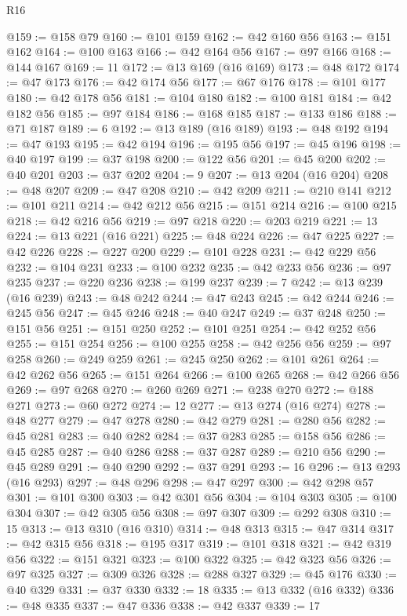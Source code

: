 \begin{lexlean}{R16}
\begin{coremodule}
@159 := @158 @79
@160 := @101 @159
@162 := @42 @160 @56
@163 := @151 @162
@164 := @100 @163
@166 := @42 @164 @56
@167 := @97 @166
@168 := @144 @167
@169 := 11
@172 := @13 @169 (@16 @169)
@173 := @48 @172
@174 := @47 @173
@176 := @42 @174 @56
@177 := @67 @176
@178 := @101 @177
@180 := @42 @178 @56
@181 := @104 @180
@182 := @100 @181
@184 := @42 @182 @56
@185 := @97 @184
@186 := @168 @185
@187 := @133 @186
@188 := @71 @187
@189 := 6
@192 := @13 @189 (@16 @189)
@193 := @48 @192
@194 := @47 @193
@195 := @42 @194
@196 := @195 @56
@197 := @45 @196
@198 := @40 @197
@199 := @37 @198
@200 := @122 @56
@201 := @45 @200
@202 := @40 @201
@203 := @37 @202
@204 := 9
@207 := @13 @204 (@16 @204)
@208 := @48 @207
@209 := @47 @208
@210 := @42 @209
@211 := @210 @141
@212 := @101 @211
@214 := @42 @212 @56
@215 := @151 @214
@216 := @100 @215
@218 := @42 @216 @56
@219 := @97 @218
@220 := @203 @219
@221 := 13
@224 := @13 @221 (@16 @221)
@225 := @48 @224
@226 := @47 @225
@227 := @42 @226
@228 := @227 @200
@229 := @101 @228
@231 := @42 @229 @56
@232 := @104 @231
@233 := @100 @232
@235 := @42 @233 @56
@236 := @97 @235
@237 := @220 @236
@238 := @199 @237
@239 := 7
@242 := @13 @239 (@16 @239)
@243 := @48 @242
@244 := @47 @243
@245 := @42 @244
@246 := @245 @56
@247 := @45 @246
@248 := @40 @247
@249 := @37 @248
@250 := @151 @56
@251 := @151 @250
@252 := @101 @251
@254 := @42 @252 @56
@255 := @151 @254
@256 := @100 @255
@258 := @42 @256 @56
@259 := @97 @258
@260 := @249 @259
@261 := @245 @250
@262 := @101 @261
@264 := @42 @262 @56
@265 := @151 @264
@266 := @100 @265
@268 := @42 @266 @56
@269 := @97 @268
@270 := @260 @269
@271 := @238 @270
@272 := @188 @271
@273 := @60 @272
@274 := 12
@277 := @13 @274 (@16 @274)
@278 := @48 @277
@279 := @47 @278
@280 := @42 @279
@281 := @280 @56
@282 := @45 @281
@283 := @40 @282
@284 := @37 @283
@285 := @158 @56
@286 := @45 @285
@287 := @40 @286
@288 := @37 @287
@289 := @210 @56
@290 := @45 @289
@291 := @40 @290
@292 := @37 @291
@293 := 16
@296 := @13 @293 (@16 @293)
@297 := @48 @296
@298 := @47 @297
@300 := @42 @298 @57
@301 := @101 @300
@303 := @42 @301 @56
@304 := @104 @303
@305 := @100 @304
@307 := @42 @305 @56
@308 := @97 @307
@309 := @292 @308
@310 := 15
@313 := @13 @310 (@16 @310)
@314 := @48 @313
@315 := @47 @314
@317 := @42 @315 @56
@318 := @195 @317
@319 := @101 @318
@321 := @42 @319 @56
@322 := @151 @321
@323 := @100 @322
@325 := @42 @323 @56
@326 := @97 @325
@327 := @309 @326
@328 := @288 @327
@329 := @45 @176
@330 := @40 @329
@331 := @37 @330
@332 := 18
@335 := @13 @332 (@16 @332)
@336 := @48 @335
@337 := @47 @336
@338 := @42 @337
@339 := 17

\end{coremodule}
\end{lexlean}
